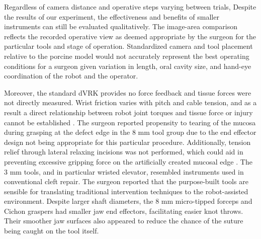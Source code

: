 Regardless of camera distance and operative steps varying between trials, Despite the results of our experiment, the effectiveness and benefits of smaller instruments can still be evaluated qualitatively. The image-area comparison reflects the recorded operative view as deemed appropriate by the surgeon for the particular tools and stage of operation. Standardized camera and tool placement relative to the porcine model would not accurately represent the best operating conditions for a surgeon given variation in length, oral cavity size, and hand-eye coordination of the robot and the operator. 

Moreover, the standard dVRK provides no force feedback and tissue forces were not directly measured. Wrist friction varies with pitch and cable tension, and as a result a direct relationship between robot joint torques and tissue force or injury cannot be established \cite{ho2024friction}. The surgeon reported propensity to tearing of the mucosa during grasping at the defect edge in the 8 mm tool group due to the end effector design not being appropriate for this particular procedure. Additionally, tension relief through lateral relaxing incisions was not performed, which could aid in preventing excessive gripping force on the artificially created mucosal edge \cite{naidu2022cleft}. The 3 mm tools, and in particular wristed elevator, resembled instruments used in conventional cleft repair. The surgeon reported that the purpose-built tools are sensible for translating traditional intervention techniques to the robot-assisted environment. Despite larger shaft diameters, the 8 mm micro-tipped forceps and Cichon graspers had smaller jaw end effectors, facilitating easier knot throws. Their smoother jaw surfaces also appeared to reduce the chance of the suture being caught on the tool itself. 


